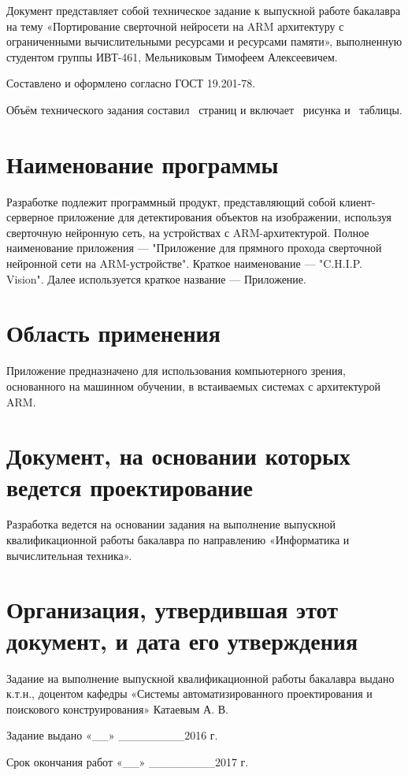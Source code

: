 \documentclass[a4paper,english]{G2-105}
\begin{document}
\par Документ представляет собой техническое задание к выпускной работе бакалавра на тему «Портирование сверточной нейросети на ARM архитектуру с ограниченными вычислительными ресурсами и ресурсами памяти», выполненную студентом группы ИВТ-461, Мельниковым Тимофеем Алексеевичем.
\par Составлено и оформлено согласно ГОСТ 19.201-78.
\par Объём технического задания составил \totalpages~страниц и включает \totalfigures~рисунка и \totaltables~таблицы. 
\VSTUInitializeTZ
\tableofcontents
\newpage


\section{Наименование программы}
\par Разработке подлежит программный продукт, представляющий собой клиент-серверное приложение для детектирования объектов на изображении, используя сверточную нейронную сеть, на устройствах с ARM-архитектурой.
Полное наименование приложения --- "Приложение для прямного прохода сверточной нейронной сети на ARM-устройстве". Краткое наименование --- "C.H.I.P. Vision". Далее используется краткое название --- Приложение.

\section{Область применения}
\par Приложение предназначено для использования компьютерного зрения, основанного на машинном обучении, в встаиваемых системах с архитектурой ARM.

\ttl
\section{Документ, на основании которых ведется проектирование}
\par Разработка ведется на основании задания на выполнение выпускной квалификационной работы бакалавра по направлению «Информатика и вычислительная техника».

\section{Организация, утвердившая этот документ, и дата его утверждения}
Задание на выполнение выпускной квалификационной работы бакалавра выдано к.т.н., доцентом кафедры «Системы автоматизированного проектирования и поискового конструирования» Катаевым А. В.
\par Задание выдано «\_\_» \_\_\_\_\_\_\_\_2016 г.
\par Срок окончания работ «\_\_» \_\_\_\_\_\_\_\_2017 г.
\end{document}
